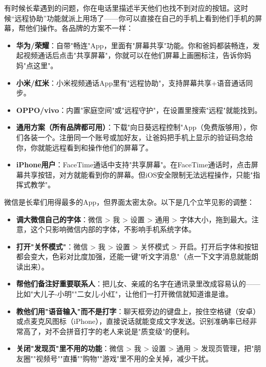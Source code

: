 
有时候长辈遇到的问题，你在电话里描述半天他们也找不到对应的按钮。这时候“远程协助”功能就派上用场了——你可以直接在自己的手机上看到他们手机的屏幕，帮他们操作。各品牌的方案不一样：

\begin{itemize}
  \item \textbf{华为/荣耀}：自带"畅连"App，里面有"屏幕共享"功能。你和爸妈都装畅连，发起视频通话后点击"共享屏幕"，你就可以在他们屏幕上画圈标注，告诉你妈妈"点这里"。
  \item \textbf{小米/红米}：小米视频通话App里有"远程协助"，支持屏幕共享+语音通话同步。
  \item \textbf{OPPO/vivo}：内置"家庭空间"或"远程守护"，在设置里搜索"远程"就能找到。
  \item \textbf{通用方案（所有品牌都可用）}：下载"向日葵远程控制"App（免费版够用），你们各装一个。注册同一个账号或加好友，让爸妈把手机上显示的验证码念给你，你就能远程看到和操作他们的屏幕了。
  \item \textbf{iPhone用户}：FaceTime通话中支持"共享屏幕"。在FaceTime通话时，点击屏幕共享按钮，对方就能看到你的屏幕。但iOS安全限制无法远程操作，只能"指挥式教学"。
\end{itemize}


微信是长辈们用得最多的App，但界面太密太杂。以下是几个立竿见影的调整：

\begin{itemize}
  \item \textbf{调大微信自己的字体}：微信 > 我 > 设置 > 通用 > 字体大小，拖到最大。注意，这个只影响微信内部的字体，不影响手机系统字体。
  \item \textbf{打开"关怀模式"}：微信 > 我 > 设置 > 关怀模式 > 开启。打开后字体和按钮都会变大，色彩对比度加强，还能一键"听文字消息"（点一下文字消息就能朗读出来）。
  \item \textbf{帮他们备注好重要联系人}：把儿女、亲戚的名字在通讯录里改成容易认的——比如"大儿子-小明""二女儿-小红"，让他们一打开微信就知道谁是谁。
  \item \textbf{教他们用"语音输入"而不是打字}：聊天框旁边的键盘上，按住空格键（安卓）或点麦克风图标（iPhone），直接说话就能变成文字发送。识别准确率已经非常高了，对不会拼音打字的老人来说是"质变级"的便利。
  \item \textbf{关闭"发现页"里不用的功能}：微信 > 我 > 设置 > 通用 > 发现页管理，把"朋友圈""视频号""直播""购物""游戏"里不用的全关掉，减少干扰。
\end{itemize}


